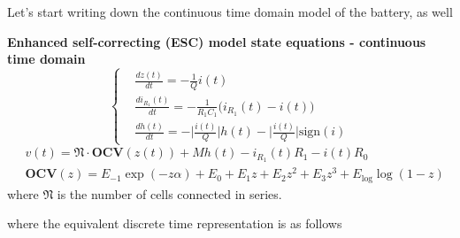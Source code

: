 \documentclass[11pt,a4paper,oneside]{book}
\numberwithin{equation}{section}
\newcommand{\abs}[1]{\big|#1\big|}
\newcommand{\sign}{\text{sign}}
\theoremstyle{it}
\theoremstyle{definition}
\begin{document}
Let's start writing down the continuous time domain model of the battery, as well
\begin{mybox}
	\textbf{Enhanced self-correcting (ESC) model state equations - continuous 
		time domain}
	\begin{equation}\label{lithium_ion_battery_ctrl_problem_eq_2}
		\left\lbrace \begin{aligned}
			&	\frac{dz(t)}{dt} = -\frac{1}{Q}i(t) \\[6pt]
			&	\frac{di_{R_1}(t)}{dt} = -\frac{1}{R_1C_1}\Big(i_{R_1}(t)-i(t)\Big) \\[6pt]
			&\frac{dh(t)}{dt} = 
			-\abs{\frac{i(t)}{Q}}h(t)-\abs{\frac{i(t)}{Q}}\sign(i) 
		\end{aligned}\right. 
	\end{equation}
	\begin{equation}\label{lithium_ion_battery_ctrl_problem_eq_1}
		\begin{aligned}
			&	v(t) = \mathfrak{N}\cdot\mathbf{OCV}(z(t)) + Mh(t) - i_{R_1}(t)R_1 
			- i(t)R_0 \\[6pt]
			& \mathbf{OCV}(z) = E_{-1}\exp(-z\alpha) + E_0 + E_1z + E_2z^2 + E_3z^3 
			+  E_\text{log}\log({1-z})
		\end{aligned}
	\end{equation}
	where $\mathfrak{N}$ is the number of cells connected in series.
\end{mybox}
where the equivalent discrete time representation is as follows
\end{document}
